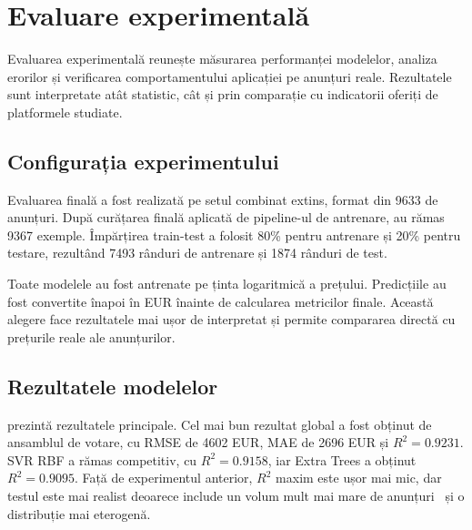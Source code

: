 \section{Evaluare experimentală}
\label{sec:testing-evaluation}

Evaluarea experimentală reunește măsurarea performanței modelelor, analiza erorilor și verificarea comportamentului aplicației pe anunțuri reale. Rezultatele sunt interpretate atât statistic, cât și prin comparație cu indicatorii oferiți de platformele studiate.

\subsection{Configurația experimentului}
\label{sec:evaluation-setup}

Evaluarea finală a fost realizată pe setul combinat extins, format din 9633 de anunțuri. După curățarea finală aplicată de pipeline-ul de antrenare, au rămas 9367 exemple. Împărțirea train-test a folosit 80\% pentru antrenare și 20\% pentru testare, rezultând 7493 rânduri de antrenare și 1874 rânduri de test.

Toate modelele au fost antrenate pe ținta logaritmică a prețului. Predicțiile au fost convertite înapoi în EUR înainte de calcularea metricilor finale. Această alegere face rezultatele mai ușor de interpretat și permite compararea directă cu prețurile reale ale anunțurilor.

\subsection{Rezultatele modelelor}
\label{sec:evaluation-results}

 prezintă rezultatele principale. Cel mai bun rezultat global a fost obținut de ansamblul de votare, cu RMSE de 4602 EUR, MAE de 2696 EUR și \(R^2 = 0.9231\). SVR RBF a rămas competitiv, cu \(R^2 = 0.9158\), iar Extra Trees a obținut \(R^2 = 0.9095\). Față de experimentul anterior, \(R^2\) maxim este ușor mai mic, dar testul este mai realist deoarece include un volum mult mai mare de anunțuri \mobilede\ și o distribuție mai eterogenă.

